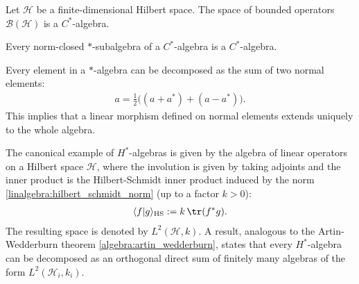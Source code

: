     \begin{example}
        Let $\mathcal{H}$ be a finite-dimensional Hilbert space. The space of bounded operators $\mathcal{B}(\mathcal{H})$ is a $C^*$-algebra.
    \end{example}

    \begin{property}
        Every norm-closed $\ast$-subalgebra of a $C^*$-algebra is a $C^*$-algebra.
    \end{property}

    \begin{property}
        Every element in a $\ast$-algebra can be decomposed as the sum of two normal elements:
        \begin{gather}
            a = \frac{1}{2}\big((a+a^*) + (a-a^*)\big).
        \end{gather}
        This implies that a linear morphism defined on normal elements extends uniquely to the whole algebra.
    \end{property}

    \begin{example}\label{operators:hilbert_schmidt_inner_product}
        The canonical example of $H^*$-algebras is given by the algebra of linear operators on a Hilbert space $\mathcal{H}$, where the involution is given by taking adjoints and the inner product is the Hilbert-Schmidt inner product induced by the norm \ref{linalgebra:hilbert_schmidt_norm} (up to a factor $k>0$):
        \begin{gather}
            \langle f|g \rangle_\text{HS} := k\,\tr(f^*g).
        \end{gather}
        The resulting space is denoted by $L^2(\mathcal{H},k)$. A result, analogous to the Artin-Wedderburn theorem \ref{algebra:artin_wedderburn}, states that every $H^*$-algebra can be decomposed as an orthogonal direct sum of finitely many algebras of the form $L^2(\mathcal{H}_i,k_i)$.
    \end{example}

